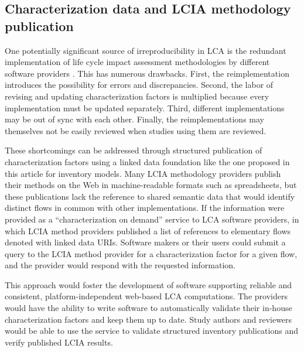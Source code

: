 \subsection{Characterization data and LCIA methodology publication}

One potentially significant source of irreproducibility in LCA is the redundant implementation of life cycle impact assessment methodologies by different software providers \citep{Speck_2015,Herrmann_2015}.  This has numerous drawbacks.  First, the reimplementation introduces the possibility for errors and discrepancies.  Second, the labor of revising and updating characterization factors is multiplied because every implementation must be updated separately.  Third, different implementations may be out of sync with each other.  Finally, the reimplementations may themselves not be easily reviewed when studies using them are reviewed.

These shortcomings can be addressed through structured publication of characterization factors using a linked data foundation like the one proposed in this article for inventory models.  Many LCIA methodology providers publish their methods on the Web in machine-readable formats such as spreadsheets, but these publications lack the reference to shared semantic data that would identify distinct flows in common with other implementations. If the information were provided as a ``characterization on demand'' service to LCA software providers, in which LCIA method providers published a list of references to elementary flows denoted with linked data URIs.  Software makers or their users could submit a query to the LCIA method provider for a characterization factor for a given flow, and the provider would respond with the requested information.

This approach would foster the development of software supporting reliable and consistent, platform-independent web-based LCA computations.  {\red The providers would have the ability to write software to automatically validate their in-house characterization factors and keep them up to date.  Study authors and reviewers would be able to use the service to validate structured inventory publications and verify published LCIA results.  
}
